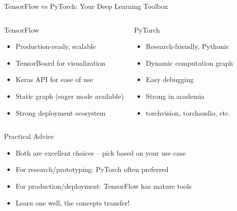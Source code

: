 \documentclass[aspectratio=169,11pt]{beamer}
\begin{document}
\begin{frame}{TensorFlow vs PyTorch: Your Deep Learning Toolbox}
\begin{columns}
\begin{block}{TensorFlow}
\begin{itemize}
    \item Production-ready, scalable
    \item TensorBoard for visualization
    \item Keras API for ease of use
    \item Static graph (eager mode available)
    \item Strong deployment ecosystem
\end{itemize}
\end{block}

\begin{block}{PyTorch}
\begin{itemize}
    \item Research-friendly, Pythonic
    \item Dynamic computation graph
    \item Easy debugging
    \item Strong in academia
    \item torchvision, torchaudio, etc.
\end{itemize}
\end{block}
\end{columns}

\vspace{1em}
\begin{alertblock}{Practical Advice}
\begin{itemize}
    \item Both are excellent choices -- pick based on your use case
    \item For research/prototyping: PyTorch often preferred
    \item For production/deployment: TensorFlow has mature tools
    \item Learn one well, the concepts transfer!
\end{itemize}
\end{alertblock}
\end{frame}
\end{document}
